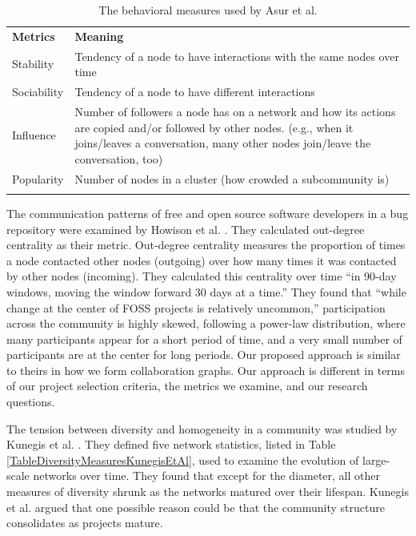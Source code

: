 \documentclass{report}
\begin{document}
\begin{table}[!htbp]
\caption{The behavioral measures used by Asur et al. \cite{Asur}}
\label{tableDiversityMeasuresAsurEtAl} 
\begin{tabular}{p{} p{}}
\hline\noalign{\smallskip}
\textbf{Metrics} & \textbf{Meaning} \\
\noalign{\smallskip}\hline\noalign{\smallskip}
Stability & Tendency of a node to have interactions with the same nodes over time \\ \hline
Sociability & Tendency of a node to have different interactions \\\hline
Influence & Number of followers a node has on a network and how its actions are copied and/or followed by other nodes. (e.g., when it joins/leaves a conversation, many other nodes join/leave the conversation, too) \\\hline
Popularity & Number of nodes in a cluster (how crowded a subcommunity is) \\
\noalign{\smallskip}\hline
\end{tabular}
\end{table}

The communication patterns of free and open source software developers in a bug repository were examined by Howison et al. \cite{HowisonSocialDynamics}. They calculated out-degree centrality as their metric. Out-degree centrality measures the proportion of times a node contacted other nodes (outgoing) over how many times it was contacted by other nodes (incoming). They calculated this centrality over time ``in 90-day windows, moving the window forward 30 days at a time.'' They found that ``while change at the center of FOSS projects is relatively uncommon,'' participation across the community is highly skewed, following a power-law distribution, where many participants appear for a short period of time, and a very small number of participants are at the center for long periods. Our proposed approach is similar to theirs in how we form collaboration graphs. Our approach is different in terms of our project selection criteria, the metrics we examine, and our research questions.

The tension between diversity and homogeneity in a community was studied by Kunegis et al. \cite{Kunegis}. They defined five network statistics, listed in Table \ref{TableDiversityMeasuresKunegisEtAl}, used to examine the evolution of large-scale networks over time. They found that except for the diameter, all other measures of diversity shrunk as the networks matured over their lifespan. Kunegis et al. \cite{Kunegis} argued that one possible reason could be that the community structure consolidates as projects mature.
\end{document}

